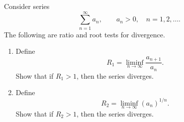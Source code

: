 \begingroup
\renewcommand{\labelenumi}{(\roman{enumi})}
\begin{exercise}
  \label{ex:hw04:divergence-tests}
  Consider series
  \[
    \sum_{n=1}^{\infty}a_n,\qquad a_n>0,\quad n=1,2,\ldots.
  \]
  The following are ratio and root tests for divergence.
  \begin{enumerate}
    \item Define
      \[
        R_1=\liminf_{n\to\infty}\frac{a_{n+1}}{a_n}.
      \]
      Show that if $R_1>1$, then the series diverges.
    \item Define
      \[
        R_2=\liminf_{n\to\infty}(a_n)^{1/n}.
      \]
      Show that if $R_2>1$, then the series diverges.
  \end{enumerate}
\end{exercise}
\endgroup
